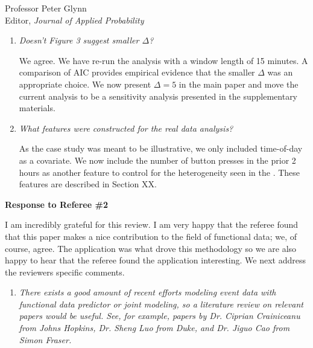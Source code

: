 \documentclass[11pt]{letter} %
\begin{document}
\begin{letter}{Professor
	Peter Glynn\\
	Editor, {\em Journal of Applied Probability}}
\begin{enumerate}
We have investigated this issue and there is a slight uptick in EDA but not in ACC; however, we are concerned that showing a longer history may not be helpful given our focus on a potentially shorter $\Delta$ based on the data analysis.  Therefore, we keep the plot as is, and note that there is a spike at 30-minutes for EDA while emphasizing that most of the signal appears in the 15-minute range.  This helps motivate our data adaptive choice of $\Delta$ in Section 7.1 which confirms that $\Delta = 5$ is the most appropriate choice although results are consistent across a range of $\Delta$ choices.
\vspace{5mm}


\item {\it Doesn’t Figure 3 suggest smaller $\Delta$?}

\vspace{5mm}
We agree.  We have re-run the analysis with a window length of 15 minutes.  A comparison of AIC provides empirical evidence that the smaller $\Delta$ was an appropriate choice.  We now present $\Delta = 5$ in the main paper and move the current analysis to be a sensitivity analysis presented in the supplementary materials.
\vspace{5mm}

\item {\it What features were constructed for the real data analysis?}

\vspace{5mm}
As the case study was meant to be illustrative, we only included time-of-day as a covariate.  We now include the number of button presses in the prior 2 hours as another feature to control for the heterogeneity seen in the .  These features are described in Section XX.
\vspace{5mm}


\end{enumerate}

\newpage

{\bf Response to Referee \#2}

I am incredibly grateful for this review.  I am very happy that the referee found that this paper makes a nice contribution to the field of functional data; we, of course, agree. The application was what drove this methodology so we are also happy to hear that the referee found the application interesting. We next address the reviewers specific comments.

\begin{enumerate}
\item {\it There exists a good amount of recent efforts modeling event data with functional data predictor or joint modeling, so a literature review on relevant papers would be useful. See, for example, papers by Dr. Ciprian Crainiceanu from Johns Hopkins, Dr. Sheng Luo from Duke, and Dr. Jiguo Cao from Simon Fraser.}


\end{enumerate}
\end{letter}
\end{document}
